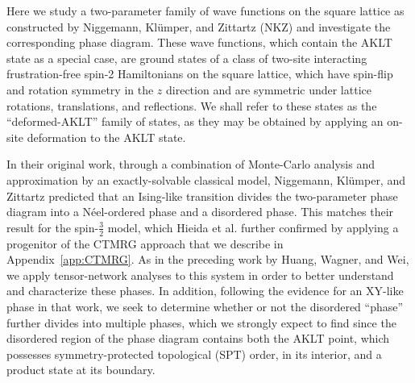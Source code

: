 \documentclass[aps,prb,letterpaper,superscriptaddress,twocolumn,showpacs,floatfix,10pt]{revtex4-1}
\begin{document}
Here we study a two-parameter family of wave functions on the square lattice
as constructed by Niggemann, Kl\"umper, and Zittartz (NKZ)
\cite{NKZspin2} and investigate the corresponding phase diagram. 
These wave functions, which contain the AKLT state as a special case,
are ground states of a class of two-site interacting frustration-free
spin-2
Hamiltonians on the square lattice, which have spin-flip and rotation symmetry
in the $z$ direction and are symmetric under lattice rotations, translations,
and reflections.\cite{NKZspin2}
We shall refer to these states as the ``deformed-AKLT'' family of states,
as they may be obtained by applying an on-site deformation to the AKLT state.

In their original work, through a combination of Monte-Carlo analysis and
approximation by an exactly-solvable classical model, Niggemann,
Kl\"umper, and Zittartz predicted that an
Ising-like transition divides
the two-parameter phase diagram into a N\'eel-ordered phase and a disordered
phase. This matches their result for the spin-$\frac{3}{2}$ model,
which Hieida et al.\cite{Hieida} further confirmed by applying a progenitor
of the CTMRG approach that we describe in Appendix~\ref{app:CTMRG}.
As in the preceding work by Huang, Wagner,
and Wei\cite{AKLTspin32},
we apply tensor-network analyses to this system in order to better 
understand and characterize these phases. In addition,
following the evidence for an 
XY-like phase in that work, we seek to determine whether or not the disordered
``phase'' further divides into multiple phases,
which we strongly expect to find since the
disordered region of the phase diagram contains both the AKLT point,
which possesses symmetry-protected topological (SPT) order,
in its interior, and a product state at its boundary.
\end{document}
